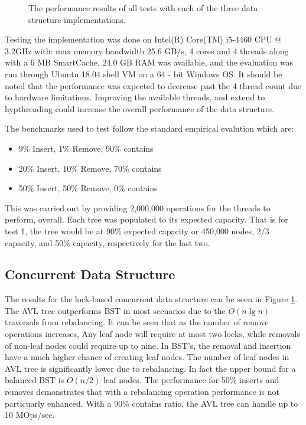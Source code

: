 \documentclass[conference]{IEEEtran}
\theoremstyle{definition}
\theoremstyle{theorem}
\begin{document}
\begin{figure}[t]
\begin{minipage}{0.33\textwidth}
\end{minipage}
\caption{The performance results of all tests with each of the three data structure implementations.}
\label{fig:data}
\end{figure}%
Testing the implementation was done on Intel(R) Core(TM) i5-4460 CPU @ 3.2GHz with: max memory bandwidth 25.6 GB/s, 4 cores and 4 threads along with a  6 MB SmartCache. 24.0 GB RAM was available, and the evaluation was run through Ubuntu 18.04 shell VM on a 64 - bit Windows OS. It should be noted that the performance was expected to decrease past the 4 thread count due to hardware limitations. Improving the available threads, and extend to hypthreading could increase the overall performance of the data structure.

The benchmarks used to test follow the standard empirical evalution which are:
\begin{itemize}
\item 9\% Insert, 1\% Remove, 90\% contains
\item 20\% Insert, 10\% Remove, 70\% contains
\item 50\% Insert, 50\% Remove, 0\% contains
\end{itemize}
This was carried out by providing 2,000,000 operations for the threads to perform, overall. Each tree was populated to its expected capacity. That is for test 1, the tree would be at 90\% expected capacity or 450,000 nodes, 2/3 capacity, and 50\% capacity, respectively for the last two.

\subsection{Concurrent Data Structure}
The results for the lock-based concurrent data structure can be seen in Figure  \ref{fig:data}. The AVL tree outperforms BST in most scenarios due to the $O(n\lg n)$ traversals from rebalancing. It can be seen that as the number of remove operations increases, Any leaf node will require at most two locks, while removals of non-leaf nodes could require up to nine. In BST's, the removal and insertion have a much higher chance of creating leaf nodes. The number of leaf nodes in AVL tree is significantly lower due to rebalancing. In fact the upper bound for a balanced BST is $O(n/2)$ leaf nodes. The performance for 50\% inserts and removes demonstrates that with a rebalancing operation performance is not particuarly enhanced. With a 90\% contains ratio, the AVL tree can handle up to 10 MOps/sec.
\end{document}
